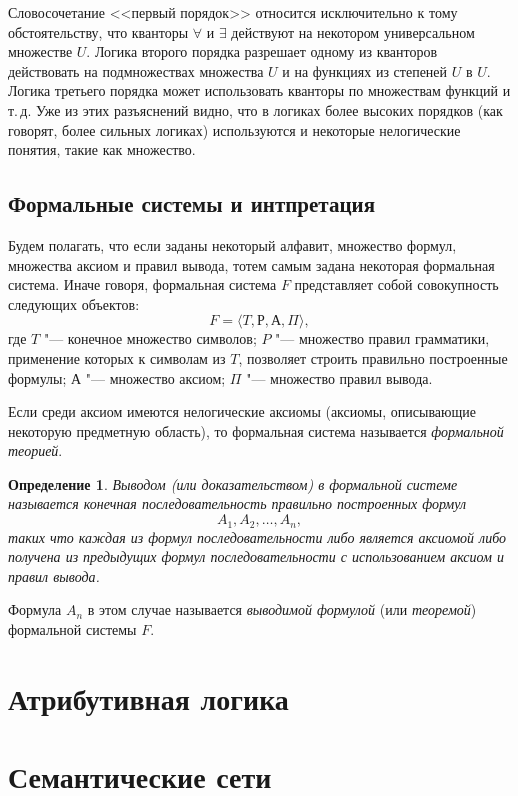 \documentclass[b5paper,11pt]{book}
\newtheorem{Def}{Определение}
\begin{document}
	Словосочетание <<первый порядок>> относится исключительно к тому обстоятельству, что кванторы $\forall$ и $\exists$ действуют на некотором универсальном множестве $U$. Логика второго порядка разрешает одному из кванторов действовать на подмножествах множества $U$ и на функциях из степеней $U$ в $U$. Логика третьего порядка может использовать кванторы по множествам функций и т.\,д. Уже из этих разъяснений видно, что в логиках более высоких порядков (как говорят, более сильных логиках) используются и некоторые нелогические понятия, такие как множество.
	
	\subsection{Формальные системы и интпретация}
	Будем полагать, что если заданы некоторый алфавит, множество формул, множества аксиом  и правил вывода, тотем самым задана некоторая формальная система. Иначе говоря, формальная система $F$ представляет собой совокупность следующих объектов:
	\[
		F=\langle T, Р, А, \Pi\rangle,
	\]
	где $T$ "--- конечное множество символов; $P$ "--- множество правил грамматики, применение которых к символам из $T$, позволяет строить правильно построенные формулы; $А$ "--- множество аксиом;	$\Pi$ "--- множество правил вывода. 
	
	Если среди аксиом имеются нелогические аксиомы (аксиомы, описывающие некоторую предметную область), то формальная система называется \textit{формальной теорией}.
	\begin{Def}
		\textit{Выводом} (или \textit{доказательством}) в формальной системе называется конечная последовательность правильно построенных формул 
		\[
			A_1,A_2,\dots,A_n,
		\] таких что каждая из формул последовательности либо является аксиомой либо получена из предыдущих формул последовательности с использованием аксиом и правил вывода.
	\end{Def}
	
	Формула $A_n$ в этом случае называется \textit{выводимой формулой} (или \textit{теоремой}) формальной системы $F$.
	
	\section{Атрибутивная логика}
	\section{Семантические сети}
	
\end{document}
